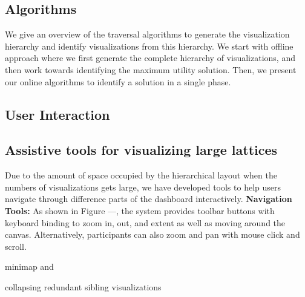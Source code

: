 \subsection{Algorithms}
We give an overview of the traversal algorithms to generate the visualization hierarchy and identify visualizations from this hierarchy. We start with offline approach where we first generate the complete hierarchy of visualizations, and then work towards identifying the maximum utility solution. Then, we present our online algorithms to identify a solution in a single phase. 


\subsection{User Interaction}

\subsection{Assistive tools for visualizing large lattices}
Due to the amount of space occupied by the hierarchical layout when the numbers of visualizations gets large, we have developed tools to help users navigate through difference parts of the dashboard interactively. 
\textbf{Navigation Tools:} As shown in Figure ---, the system provides toolbar buttons with keyboard binding to zoom in, out, and extent as well as moving around the canvas. Alternatively, participants can also zoom and pan with mouse click and scroll.  

minimap and

collapsing redundant sibling visualizations
